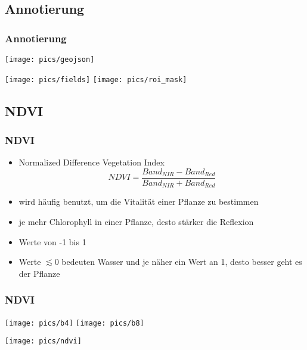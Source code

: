 \documentclass{beamer}
\begin{document}

\begin{frame}\section{Annotierung}\frametitle{Annotierung}
\begin{minipage}{0.5\textwidth}
	\texttt{[image: pics/geojson]}
\end{minipage}
\hspace{1em}
\begin{minipage}{0.4\textwidth}
	\texttt{[image: pics/fields]}
	\texttt{[image: pics/roi\_mask]}
\end{minipage}
\end{frame}


\begin{frame}\section{NDVI}\frametitle{NDVI}
	\begin{itemize}
		\item Normalized Difference Vegetation Index
		\begin{equation*}
			NDVI = \frac{Band_{NIR} - Band_{Red}} {Band_{NIR} + Band_{Red}}
		\end{equation*}
		\item wird häufig benutzt, um die Vitalität einer Pflanze zu bestimmen
		\item je mehr Chlorophyll in einer Pflanze, desto stärker die Reflexion
		\item Werte von -1 bis 1
		\item Werte $\lesssim 0$ bedeuten Wasser und je näher ein Wert an 1, desto besser geht es der Pflanze
	\end{itemize}
\end{frame}

\begin{frame}\frametitle{NDVI}
\begin{minipage}{0.4\textwidth}
	\texttt{[image: pics/b4]}
	\texttt{[image: pics/b8]}
\end{minipage}
\hspace{2em}
\begin{minipage}{0.4\textwidth}
	\texttt{[image: pics/ndvi]}
\end{minipage}
\end{frame}
\end{document}
